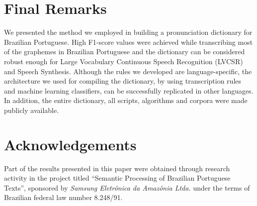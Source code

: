 \section{Final Remarks}

We presented the method we employed in building a pronunciation dictionary for Brazilian Portuguese. High F1-score 
values were achieved while transcribing most of the graphemes in Brazilian Portuguese and the dictionary can be
considered robust enough for Large Vocabulary Continuous Speech Recognition (LVCSR) and Speech Synthesis. Although 
the rules we developed are language-specific, the architecture we used for compiling the dictionary, by using transcription
rules and machine learning classifiers, can be successfully replicated in other languages. In addition, the entire dictionary,
all scripts, algorithms and corpora were made publicly available.


\section{Acknowledgements}
Part of the results presented in this paper were obtained through research activity in the project titled 
``Semantic Processing of Brazilian Portuguese Texts'', sponsored by \emph{Samsung Eletr\^onica da Amaz\^onia Ltda.} under 
the terms of Brazilian federal law number 8.248/91.


